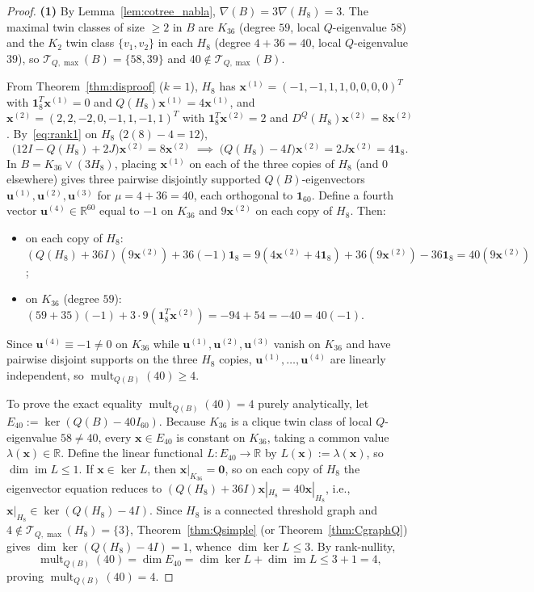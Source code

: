 \documentclass[11pt,a4paper]{article}
\theoremstyle{definition}
\DeclareMathOperator{\mult}{mult}
\DeclareMathOperator{\im}{im}
\begin{document}
\begin{proof}
  \textbf{(1)} By Lemma~\ref{lem:cotree_nabla}, $\nabla(B) = 3\nabla(H_8) = 3$. The maximal twin classes of size $\ge 2$ in $B$ are $K_{36}$ (degree $59$, local $Q$-eigenvalue $58$) and the $K_2$ twin class $\{v_1, v_2\}$ in each $H_8$ (degree $4 + 36 = 40$, local $Q$-eigenvalue $39$), so $\mathcal{T}_{Q,\max}(B) = \{58, 39\}$ and $40 \notin \mathcal{T}_{Q,\max}(B)$.

  From Theorem~\ref{thm:disproof} ($k=1$), $H_8$ has $\mathbf{x}^{(1)} = (-1,-1,1,1,0,0,0,0)^T$ with $\mathbf{1}_8^T \mathbf{x}^{(1)} = 0$ and $Q(H_8)\mathbf{x}^{(1)} = 4\mathbf{x}^{(1)}$, and $\mathbf{x}^{(2)} = (2,2,-2,0,-1,1,-1,1)^T$ with $\mathbf{1}_8^T \mathbf{x}^{(2)} = 2$ and $D^Q(H_8)\mathbf{x}^{(2)} = 8\mathbf{x}^{(2)}$. By~\eqref{eq:rank1} on $H_8$ ($2(8)-4 = 12$),
  \[
    \bigl(12I - Q(H_8) + 2J\bigr)\mathbf{x}^{(2)} = 8\mathbf{x}^{(2)} \;\implies\; \bigl(Q(H_8) - 4I\bigr)\mathbf{x}^{(2)} = 2J\mathbf{x}^{(2)} = 4\mathbf{1}_8.
  \]
  In $B = K_{36} \vee (3H_8)$, placing $\mathbf{x}^{(1)}$ on each of the three copies of $H_8$ (and $0$ elsewhere) gives three pairwise disjointly supported $Q(B)$-eigenvectors $\mathbf{u}^{(1)}, \mathbf{u}^{(2)}, \mathbf{u}^{(3)}$ for $\mu = 4 + 36 = 40$, each orthogonal to $\mathbf{1}_{60}$. Define a fourth vector $\mathbf{u}^{(4)} \in \mathbb{R}^{60}$ equal to $-1$ on $K_{36}$ and $9\mathbf{x}^{(2)}$ on each copy of $H_8$. Then:
  \begin{itemize}
    \item on each copy of $H_8$: $(Q(H_8) + 36I)(9\mathbf{x}^{(2)}) + 36(-1)\mathbf{1}_8 = 9(4\mathbf{x}^{(2)} + 4\mathbf{1}_8) + 36(9\mathbf{x}^{(2)}) - 36\mathbf{1}_8 = 40(9\mathbf{x}^{(2)})$;
    \item on $K_{36}$ (degree $59$): $(59 + 35)(-1) + 3 \cdot 9(\mathbf{1}_8^T \mathbf{x}^{(2)}) = -94 + 54 = -40 = 40(-1)$.
  \end{itemize}
  Since $\mathbf{u}^{(4)} \equiv -1 \ne 0$ on $K_{36}$ while $\mathbf{u}^{(1)}, \mathbf{u}^{(2)}, \mathbf{u}^{(3)}$ vanish on $K_{36}$ and have pairwise disjoint supports on the three $H_8$ copies, $\mathbf{u}^{(1)},\dots,\mathbf{u}^{(4)}$ are linearly independent, so $\mult_{Q(B)}(40) \ge 4$.

  To prove the exact equality $\mult_{Q(B)}(40) = 4$ purely analytically, let $E_{40} := \ker(Q(B) - 40 I_{60})$. Because $K_{36}$ is a clique twin class of local $Q$-eigenvalue $58 \ne 40$, every $\mathbf{x} \in E_{40}$ is constant on $K_{36}$, taking a common value $\lambda(\mathbf{x}) \in \mathbb{R}$. Define the linear functional $L : E_{40} \to \mathbb{R}$ by $L(\mathbf{x}) := \lambda(\mathbf{x})$, so $\dim\im L \le 1$. If $\mathbf{x} \in \ker L$, then $\mathbf{x}|_{K_{36}} = \mathbf{0}$, so on each copy of $H_8$ the eigenvector equation reduces to $(Q(H_8) + 36I)\mathbf{x}|_{H_8} = 40\mathbf{x}|_{H_8}$, i.e., $\mathbf{x}|_{H_8} \in \ker(Q(H_8) - 4I)$. Since $H_8$ is a connected threshold graph and $4 \notin \mathcal{T}_{Q,\max}(H_8) = \{3\}$, Theorem~\ref{thm:Qsimple} (or Theorem~\ref{thm:CgraphQ}) gives $\dim\ker(Q(H_8) - 4I) = 1$, whence $\dim\ker L \le 3$. By rank-nullity,
  \[
    \mult_{Q(B)}(40) = \dim E_{40} = \dim\ker L + \dim\im L \le 3 + 1 = 4,
  \]
  proving $\mult_{Q(B)}(40) = 4$.


\end{proof}
\end{document}
